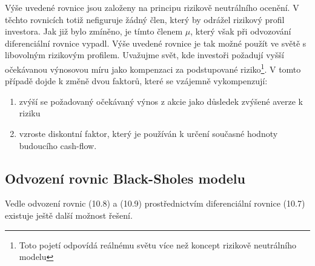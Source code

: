 \documentclass[a4paper]{book}
\begin{document}
Výše uvedené rovnice jsou založeny na principu rizikově neutrálního ocenění. V těchto rovnicích totiž nefiguruje žádný člen, který by odrážel rizikový profil investora. Jak již bylo zmíněno, je tímto členem $\mu$, který však při odvozování diferenciální rovnice vypadl.
Výše uvedené rovnice je tak  možné použít ve světě s libovolným rizikovým profilem. Uvažujme svět, kde investoři požadují vyšší očekávanou výnosovou míru jako kompenzaci za podstupované riziko\footnote{Toto pojetí odpovídá reálnému světu více než koncept rizikově neutrálního modelu}. V tomto případě dojde k změně dvou faktorů, které se vzájemně vykompenzují:
\begin{enumerate}
\item zvýší se požadovaný očekávaný výnos z akcie jako důsledek zvýšené averze k riziku
\item vzroste diskontní faktor, který je používán k určení současné hodnoty budoucího cash-flow.
\end{enumerate}

\subsection{Odvození rovnic Black-Sholes modelu}
Vedle odvození rovnic (10.8) a (10.9) prostřednictvím diferenciální rovnice (10.7) existuje ještě další možnost řešení.
\end{document}
